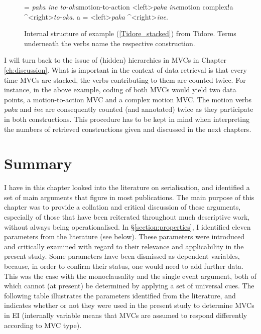 \begin{figure}[h]
\jtree[xunit=8em]
\! = {\textit{paka ine to-oka}}{motion-to-action}
<left>{\textit{paka ine}}{motion complex}!a ^<right>{\textit{to-oka}}.
\!a = <left>{\textit{paka}} ^<right>{\textit{ine}}.
\endjtree


\caption[Internal structure of example (\ref{Tidore_stacked}) from Tidore]{Internal structure of example (\ref{Tidore_stacked}) from Tidore. Terms underneath the verbs name the respective construction.}
\label{figure:tidoreMVC}
\end{figure}

I will turn back to the issue of (hidden) hierarchies in MVCs in Chapter \ref{ch:discussion}. What is important in the context of data retrieval is that every time MVCs are stacked, the verbs contributing to them are counted twice. For instance, in the above example, coding of both MVCs would yield two data points, a motion-to-action MVC and a complex motion MVC. The motion verbs \textit{paka} and \textit{ine} are consequently counted (and annotated) twice as they participate in both constructions. This procedure has to be kept in mind when interpreting the numbers of retrieved constructions given and discussed in the next chapters.

\section{Summary}

I have in this chapter looked into the literature on serialisation, and identified a set of main arguments that figure in most publications. The main purpose of this chapter was to provide a collation and critical discussion of these arguments, especially of those that have been reiterated throughout much descriptive work, without always being operationalised. In §\ref{section:properties}, I identified eleven parameters from the literature (see below). These parameters were introduced and critically examined with regard to their relevance and applicability in the present study. Some parameters have been dismissed as dependent variables, because, in order to confirm their status, one would need to add further data. This was the case with the monoclausality and the single event argument, both of which cannot (at present) be determined by applying a set of universal cues. The following table illustrates the parameters identified from the literature, and indicates whether or not they were used in the present study to determine MVCs in EI (internally variable means that MVCs are assumed to respond differently according to MVC type).

